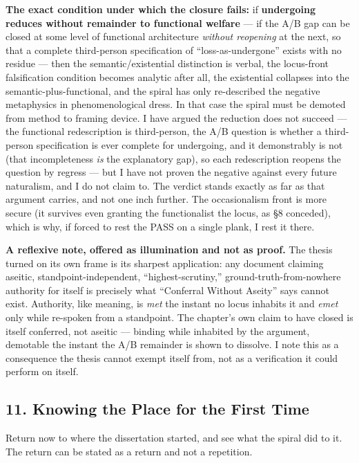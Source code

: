 \documentclass[11pt]{article}
\begin{document}
\textbf{The exact condition under which the closure fails:} if \textbf{undergoing reduces without remainder to functional welfare} — if the A/\allowbreak{}B gap can be closed at some level of functional architecture \emph{without reopening} at the next, so that a complete third-person specification of ``loss-as-undergone'' exists with no residue — then the semantic/\allowbreak{}existential distinction is verbal, the locus-front falsification condition becomes analytic after all, the existential collapses into the semantic-plus-functional, and the spiral has only re-described the negative metaphysics in phenomenological dress. In that case the spiral must be demoted from method to framing device. I have argued the reduction does not succeed — the functional redescription is third-person, the A/\allowbreak{}B question is whether a third-person specification is ever complete for undergoing, and it demonstrably is not (that incompleteness \emph{is} the explanatory gap), so each redescription reopens the question by regress — but I have not proven the negative against every future naturalism, and I do not claim to. The verdict stands exactly as far as that argument carries, and not one inch further. The occasionalism front is more secure (it survives even granting the functionalist the locus, as §8 conceded), which is why, if forced to rest the PASS on a single plank, I rest it there.

\textbf{A reflexive note, offered as illumination and not as proof.} The thesis turned on its own frame is its sharpest application: any document claiming aseitic, standpoint-independent, ``highest-scrutiny,'' ground-truth-from-nowhere authority for itself is precisely what ``Conferral Without Aseity'' says cannot exist. Authority, like meaning, is \emph{met} the instant no locus inhabits it and \emph{emet} only while re-spoken from a standpoint. The chapter's own claim to have closed is itself conferred, not aseitic — binding while inhabited by the argument, demotable the instant the A/\allowbreak{}B remainder is shown to dissolve. I note this as a consequence the thesis cannot exempt itself from, not as a verification it could perform on itself.

\subsection*{11. Knowing the Place for the First Time}

Return now to where the dissertation started, and see what the spiral did to it. The return can be stated as a return and not a repetition.
\end{document}
